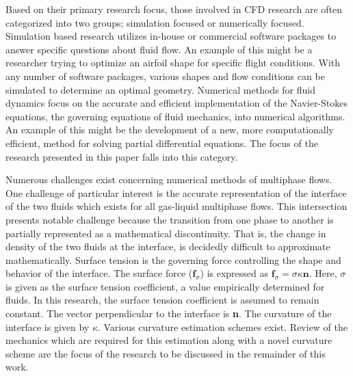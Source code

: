  Based on their primary research focus, those involved in CFD research are often categorized into two groups; simulation focused or numerically focused. Simulation based research utilizes in-house or commercial software packages to answer specific questions about fluid flow. An example of this might be a researcher trying to optimize an airfoil shape for specific flight conditions. With any number of software packages, various shapes and flow conditions can be simulated to determine an optimal geometry. Numerical methods for fluid dynamics focus on the accurate and efficient implementation of the Navier-Stokes equations, the governing equations of fluid mechanics, into numerical algorithms. An example of this might be the development of a new, more computationally efficient, method for solving partial differential equations. The focus of the research presented in this paper falls into this category.

Numerous challenges exist concerning numerical methods of multiphase flows. One challenge of particular interest is the accurate representation of the interface of the two fluids which exists for all gas-liquid multiphase flows. This intersection presents notable challenge because the transition from one phase to another is partially represented as a mathematical discontinuity. That is, the change in density of the two fluids at the interface, is decidedly difficult to approximate mathematically. Surface tension is the governing force controlling the shape and behavior of the interface. The surface force ($\textbf{f}_{\sigma}$) is expressed as $\textbf{f}_{\sigma} = \sigma \kappa \textbf{n}$\cite{Desjardins2013}. Here, $\sigma$ is given as the surface tension coefficient, a value empirically determined for fluids. In this research, the surface tension coefficient is assumed to remain constant. The vector perpendicular to the interface is \textbf{n}. The curvature of the interface is given by $\kappa$. Various curvature estimation schemes exist. Review of the mechanics which are required for this estimation along with a novel curvature scheme are the focus of the research to be discussed in the remainder of this work.

 

